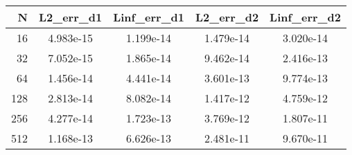 \begin{tabular}{rcccc}
\toprule
  N & L2_err_d1 & Linf_err_d1 & L2_err_d2 & Linf_err_d2 \\
\midrule
 16 & 4.983e-15 &   1.199e-14 & 1.479e-14 &   3.020e-14 \\
 32 & 7.052e-15 &   1.865e-14 & 9.462e-14 &   2.416e-13 \\
 64 & 1.456e-14 &   4.441e-14 & 3.601e-13 &   9.774e-13 \\
128 & 2.813e-14 &   8.082e-14 & 1.417e-12 &   4.759e-12 \\
256 & 4.277e-14 &   1.723e-13 & 3.769e-12 &   1.807e-11 \\
512 & 1.168e-13 &   6.626e-13 & 2.481e-11 &   9.670e-11 \\
\bottomrule
\end{tabular}

